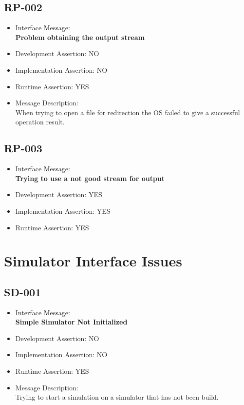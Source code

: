 \subsection{RP-002}
\begin{itemize}
  \item Interface Message:\\[1em]
    \textbf{Problem obtaining the output stream}
  \item Development Assertion: NO
  \item Implementation Assertion: NO
  \item Runtime Assertion: YES
  \item Message Description:\\[1em]
    When trying to open a file for redirection the OS failed to give a successful operation result.
\end{itemize}

\subsection{RP-003}
\begin{itemize}
  \item Interface Message:\\[1em]
    \textbf{Trying to use a not good stream for output}
  \item Development Assertion: YES
  \item Implementation Assertion: YES
  \item Runtime Assertion: YES
\end{itemize}

\section{Simulator Interface Issues}

\subsection{SD-001}
\begin{itemize}
  \item Interface Message:\\[1em]
    \textbf{Simple Simulator Not Initialized}
  \item Development Assertion: NO
  \item Implementation Assertion: NO
  \item Runtime Assertion: YES
  \item Message Description:\\[1em]
    Trying to start a simulation on a simulator that has not been build.
\end{itemize}

